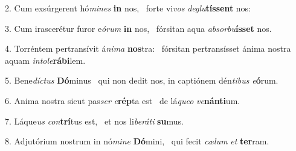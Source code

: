2. Cum exsúrgerent hó\textit{mi}\textit{nes} \textbf{in} nos, \ast\  forte vi\textit{vos} \textit{de}\textit{glu}\textbf{tís}\textbf{sent} nos:\

3. Cum irascerétur furor e\textit{ó}\textit{rum} \textbf{in} nos, \ast\  fórsitan aqua \textit{ab}\textit{sor}\textit{bu}\textbf{ís}\textbf{set} nos.\

4. Torréntem pertransívit á\textit{ni}\textit{ma} \textbf{nos}tra: \ast\  fórsitan pertransísset ánima nostra aquam \textit{in}\textit{to}\textit{le}\textbf{rá}\textbf{bi}lem.\

5. Bene\textit{díc}\textit{tus} \textbf{Dó}minus \ast\  qui non dedit nos, in captiónem dén\textit{ti}\textit{bus} \textit{e}\textbf{ó}rum.\

6. Anima nostra sicut pas\textit{ser} \textit{e}\textbf{rép}ta est \ast\  de lá\textit{que}\textit{o} \textit{ve}\textbf{nán}\textbf{ti}um.\

7. Láque\textit{us} \textit{con}\textbf{trí}tus est, \ast\  et nos li\textit{be}\textit{rá}\textit{ti} \textbf{su}mus.\

8. Adjutórium nostrum in nó\textit{mi}\textit{ne} \textbf{Dó}mini, \ast\  qui fecit \textit{cæ}\textit{lum} \textit{et} \textbf{ter}ram.\

